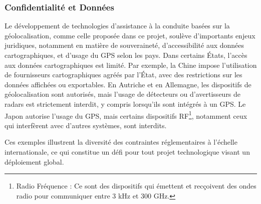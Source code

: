 \subsubsection{Confidentialité et Données}
Le développement de technologies d’assistance à la conduite basées sur la géolocalisation, comme celle proposée dans ce projet, soulève d’importants enjeux juridiques, notamment en matière de souveraineté, d’accessibilité aux données cartographiques, et d’usage du GPS selon les pays.
Dans certains États, l’accès aux données cartographiques est limité. Par exemple, la Chine impose l’utilisation de fournisseurs cartographiques agréés par l’État, avec des restrictions sur les données affichées ou exportables. En Autriche et en Allemagne, les dispositifs de géolocalisation sont autorisés, mais l’usage de détecteurs ou d'avertisseurs de radars est strictement interdit, y compris lorsqu'ils sont intégrés à un GPS. Le Japon autorise l’usage du GPS, mais certains dispositifs RF\footnote{Radio Fréquence : Ce sont des dispositifs qui émettent et recçoivent des ondes radio pour communiquer entre 3 kHz et 300 GHz.}, notamment ceux qui interfèrent avec d'autres systèmes, sont interdits.

Ces exemples illustrent la diversité des contraintes réglementaires à l’échelle internationale, ce qui constitue un défi pour tout projet technologique visant un déploiement global.\\

